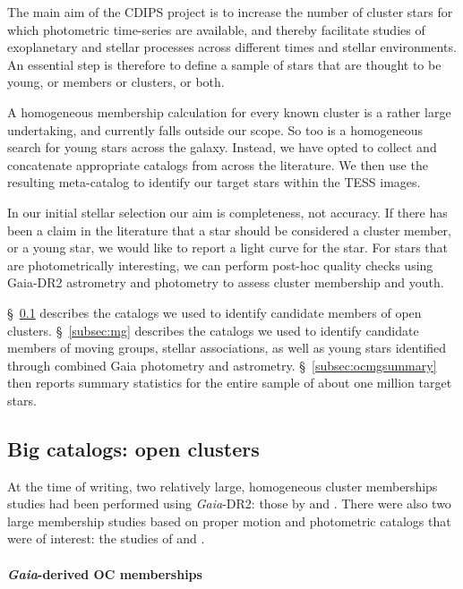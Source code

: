 \documentclass[12pt,twocolumn,tighten]{aastex62}
\begin{document}
The main aim of the CDIPS project is to increase the number of cluster
stars for which photometric time-series are available, and thereby
facilitate studies of exoplanetary and stellar processes across
different times and stellar environments.  An essential step is
therefore to define a sample of stars that are thought to be young, or
members or clusters, or both.

A homogeneous membership calculation for every known cluster is a
rather large undertaking, and currently falls outside our scope.  So
too is a homogeneous search for young stars across the galaxy.
Instead, we have opted to collect and concatenate appropriate catalogs
from across the literature.  We then use the resulting meta-catalog to
identify our target stars within the TESS images.

In our initial stellar selection our aim is completeness, not
accuracy.  If there has been a claim in the literature that a star
should be considered a cluster member, or a young star, we would like
to report a light curve for the star.  For stars that are
photometrically interesting, we can perform post-hoc quality checks
using Gaia-DR2 astrometry and photometry to assess cluster membership
and youth.

\S~\ref{subsec:oc} describes the catalogs we used to identify
candidate members of open clusters.  \S~\ref{subsec:mg} describes the
catalogs we used to identify candidate members of moving groups,
stellar associations, as well as young stars identified through
combined Gaia photometry and astrometry.  \S~\ref{subsec:ocmgsummary}
then reports summary statistics for the entire sample of about one
million target stars.


\subsection{Big catalogs: open clusters}
\label{subsec:oc}

At the time of writing, two relatively large, homogeneous cluster
memberships studies had been performed using {\it Gaia}-DR2: those by
\citet{cantat-gaudin_gaia_2018} and \citet{gaia_hr_2018}.
There were also two large membership studies based on proper motion and 
photometric catalogs that were of interest: the studies of
\citet{Kharchenko_et_al_2013} and \citet{dias_proper_2014}.

\paragraph{{\it Gaia}-derived OC memberships}
\end{document}

